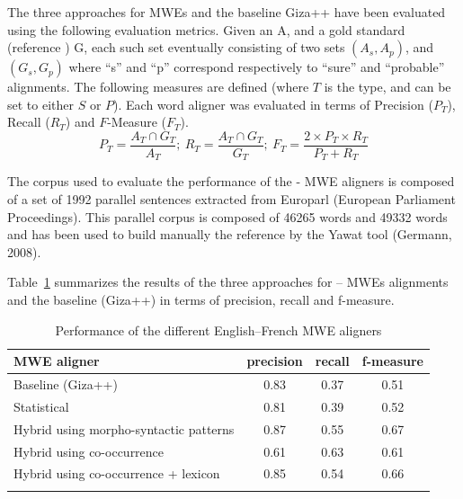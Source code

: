 \documentclass[output=paper,modfonts,nonflat]{langsci/langscibook}
\begin{document}
The three approaches for MWEs  and the baseline Giza++ \citep{och2000improved} have been evaluated using the following evaluation metrics. 
Given an  A, and a gold standard  (reference ) G, each such  set eventually consisting of two sets $(A_s, A_p)$, and $(G_s, G_p)$ where ``s'' and ``p'' correspond respectively to ``sure'' and ``probable'' alignments. 
The following measures are defined (where $T$ is the  type, and can be set to either $S$ or $P$). Each word aligner was evaluated in terms of Precision ($P_T$), Recall ($R_T$) and $F$-Measure ($F_T$).
\begin{equation}
P_T=\frac{A_T \cap G_T}{A_T} ;~
R_T=\frac{A_T \cap G_T}{G_T} ;~
F_T=\frac{2 \times P_T \times R_T}{P_T + R_T}
\label{sem:equa:PRF}
\end{equation}

The corpus used to evaluate the performance of the - MWE aligners is composed of a set of 1992 parallel sentences extracted from Europarl (European Parliament Proceedings). This parallel corpus is composed of 46265  words and 49332  words and has been used to build manually the reference  by the Yawat tool (Germann, 2008).

Table~\ref{sem:tab:resultsPRF_en-fr} summarizes the results of the three approaches for -- MWEs alignments and the baseline (Giza++) in terms of precision, recall and f-measure.

\begin{table}
\caption{Performance of the different English--French MWE aligners}
\label{sem:tab:resultsPRF_en-fr}
 \begin{tabular}{p{6.5cm}ccc}
  \lsptoprule
            \textnormal{MWE aligner} & \textnormal{precision} & \textnormal{recall} & \textnormal{f-measure} \\
  \midrule
Baseline (Giza++) & 0.83 & 0.37 & 0.51 \\
Statistical & 0.81 & 0.39 & 0.52 \\
Hybrid using morpho-syntactic patterns & 0.87 & 0.55 & 0.67 \\
Hybrid using co-occurrence & 0.61 & 0.63 & 0.61 \\
Hybrid using co-occurrence + lexicon & 0.85 & 0.54 & 0.66 \\
  \lspbottomrule
 \end{tabular}
\end{table}
\end{document}
